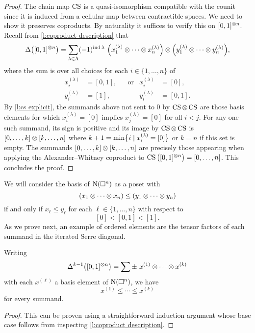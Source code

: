 \begin{proof}
	The chain map $\CS$ is a quasi-isomorphism compatible with the counit since it is induced from a cellular map between contractible spaces.
	We need to show it preserves coproducts.
	By naturality it suffices to verify this on $[0,1]^{\ot n}$.
	Recall from \cref{l:coproduct description} that
	\[
	\Delta \big( [0,1]^{\ot n} \big) =
	\sum_{\lambda \in \Lambda} (-1)^{\ind \lambda} \
	\Big(x_1^{(\lambda)} \ot \cdots \ot x_n^{(\lambda)}\Big) \ot
	\Big(y_1^{(\lambda)} \ot \cdots \ot y_n^{(\lambda)}\Big),
	\]
	where the sum is over all choices for each $i \in \{1,\dots,n\}$ of
	\begin{align*}
		x_i^{(\lambda)} &= [0,1],&&\text{or} & x_i^{(\lambda)} &= [0], \\
		y_i^{(\lambda)} &= [1], && & y_i^{(\lambda)} &= [0,1].
	\end{align*}
	By \cref{l:cs explicit}, the summands above not sent to $0$ by $\CS \ot \CS$ are those basis elements for which $x_i^{(\lambda)} = [0]$ implies $x_j^{(\lambda)} = [0]$ for all $i < j$.
	For any one such summand, its sign is positive and its image by $\CS \ot \CS$ is $[0, \dots, k] \ot [k, \dots, n]$ where $k+1 = \min\set[\big]{i \mid x_i^{(\lambda)} = [0]}$ or $k = n$ if this set is empty.
	The summands $[0, \dots, k] \ot [k,\dots,n]$ are precisely those appearing when applying the Alexander--Whitney coproduct to $\CS \big([0,1]^{\ot n}\big) = [0,\dots,n]$.
	This concludes the proof.
\end{proof}

We will consider the basis of $\chains(\cube^n)$ as a poset with
\[
(x_1 \ot \cdots \ot x_n) \leq (y_1 \ot \cdots \ot y_n)
\]
if and only if $x_\ell \leq y_\ell$ for each $\ell \in \{1, \dots, n\}$ with respect to
\[
[0] < [0,1] < [1].
\]
As we prove next, an example of ordered elements are the tensor factors of each summand in the iterated Serre diagonal.

\begin{lemma} \label{l:order iterated coproduct}
	Writing
	\[
	\Delta^{k-1} \big([0,1]^{\ot n}\big) =
	\sum \pm \ x^{(1)} \ot \cdots \ot x^{(k)}
	\]
	with each $x^{(\ell)}$ a basis element of $\chains(\cube^n)$, we have
	\[
	x^{(1)} \leq \cdots \leq x^{(k)}
	\]
	for every summand.
\end{lemma}

\begin{proof}
	This can be proven using a straightforward induction argument whose base case follows from inspecting \cref{l:coproduct description}.
\end{proof}

